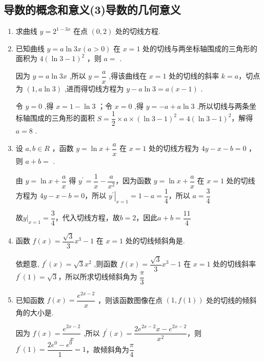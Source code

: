 \subsection*{导数的概念和意义(3)导数的几何意义}
\begin{enumerate}
    \item 求曲线 $y = {2}^{1 - {3x}}$ 在点 $\left( {0,2}\right)$ 处的切线方程.
    
    \item 已知曲线 $y = a\ln {3x}\left( {a > 0}\right)$ 在 $x = 1$ 处的切线与两坐标轴围成的三角形的面积为 $4{\left( \ln 3 - 1\right) }^{2}$ ，则 $a =$ .
    \begin{jieda}
        因为 $y = a\ln {3x}$ ,所以 $y = \dfrac{a}{x}$ ,得该曲线在 $x = 1$ 处的切线的斜率 $k = a$，切点为 $\left( {1,a\ln 3}\right)$ ,进而得切线方程为 $y - a\ln 3 = a\left( {x - 1}\right)$ .
        
        令 $y = 0$ ,得 $x = 1 - \ln 3$ ；令 $x = 0$ ,得 $y =  - a + a\ln 3$ .所以切线与两条坐标轴围成的三角形的面积 $S = \dfrac{1}{2} \times  a \times  {\left( \ln 3 - 1\right) }^{2} = 4{\left( \ln 3 - 1\right) }^{2}$，解得 $a = 8$ .
    \end{jieda}

    \item 设 $a,b \in  {R}$ ，函数 $y = \ln x + \dfrac{a}{x}$ 在 $x = 1$ 处的切线方程为 ${4y} - x - b = 0$ ， 则 $a + b =$ .
    \begin{jieda}
        由 $y = \ln x + \dfrac{a}{x}$ 得 ${y}^{\prime } = \dfrac{1}{x} - \dfrac{a}{{x}^{2}}$，因为函数 $y = \ln x + \dfrac{a}{x}$ 在 $x = 1$ 处的切线方程为 ${4y} - x - b = 0$，所以 ${\left. {y}^{\prime }\right| }_{x = 1} = 1 - a = \dfrac{1}{4}$，所以 $a = \dfrac{3}{4}$

        故$y|_{x=1} = \dfrac{3}{4}$，代入切线方程，故$b = 2$，因此$a+b = \dfrac{11}{4}$
    \end{jieda}

    \item 函数 $f\left( x\right)  = \dfrac{\sqrt{3}}{3}{x}^{3} - 1$ 在 $x = 1$ 处的切线倾斜角是.
    \begin{jieda}
        依题意, ${f}^{\prime }\left( x\right)  = \sqrt{3}{x}^{2}$ ,则函数 $f\left( x\right)  = \dfrac{\sqrt{3}}{3}{x}^{3} - 1$ 在 $x = 1$ 处的切线斜率 ${f}^{\prime }\left( 1\right)  = \sqrt{3}$，所以所求切线倾斜角为 $\dfrac{\pi }{3}$ 
    \end{jieda}

    \item 已知函数 $f\left( x\right)  = \dfrac{{{e}}^{{2x} - 2}}{x}$ ，则该函数图像在点 $\left( {1,f\left( 1\right) }\right)$ 处的切线的倾斜角的大小是.
    \begin{jieda}
        因为 $f\left( x\right)  = \dfrac{{{e}}^{{2x} - 2}}{x}$ ,所以 ${f}^{\prime }\left( x\right)  = \dfrac{2{{e}}^{{2x} - 2}x - {{e}}^{{2x} - 2}}{{x}^{2}}$，则 ${f}^{\prime }\left( 1\right)  = \dfrac{2{{e}}^{0} - {{e}}^{0}}{1} = 1$，故倾斜角为$\dfrac{\pi}{4}$
    \end{jieda}


\end{enumerate}
